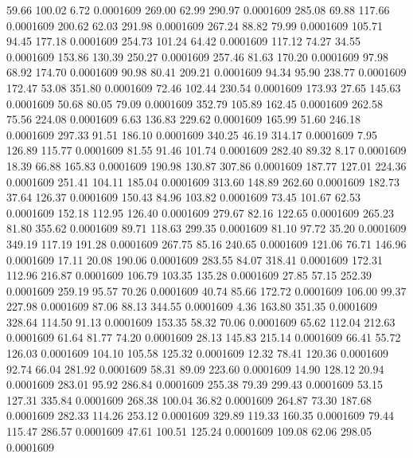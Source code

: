   59.66  100.02    6.72   0.0001609
 269.00   62.99  290.97   0.0001609
 285.08   69.88  117.66   0.0001609
 200.62   62.03  291.98   0.0001609
 267.24   88.82   79.99   0.0001609
 105.71   94.45  177.18   0.0001609
 254.73  101.24   64.42   0.0001609
 117.12   74.27   34.55   0.0001609
 153.86  130.39  250.27   0.0001609
 257.46   81.63  170.20   0.0001609
  97.98   68.92  174.70   0.0001609
  90.98   80.41  209.21   0.0001609
  94.34   95.90  238.77   0.0001609
 172.47   53.08  351.80   0.0001609
  72.46  102.44  230.54   0.0001609
 173.93   27.65  145.63   0.0001609
  50.68   80.05   79.09   0.0001609
 352.79  105.89  162.45   0.0001609
 262.58   75.56  224.08   0.0001609
   6.63  136.83  229.62   0.0001609
 165.99   51.60  246.18   0.0001609
 297.33   91.51  186.10   0.0001609
 340.25   46.19  314.17   0.0001609
   7.95  126.89  115.77   0.0001609
  81.55   91.46  101.74   0.0001609
 282.40   89.32    8.17   0.0001609
  18.39   66.88  165.83   0.0001609
 190.98  130.87  307.86   0.0001609
 187.77  127.01  224.36   0.0001609
 251.41  104.11  185.04   0.0001609
 313.60  148.89  262.60   0.0001609
 182.73   37.64  126.37   0.0001609
 150.43   84.96  103.82   0.0001609
  73.45  101.67   62.53   0.0001609
 152.18  112.95  126.40   0.0001609
 279.67   82.16  122.65   0.0001609
 265.23   81.80  355.62   0.0001609
  89.71  118.63  299.35   0.0001609
  81.10   97.72   35.20   0.0001609
 349.19  117.19  191.28   0.0001609
 267.75   85.16  240.65   0.0001609
 121.06   76.71  146.96   0.0001609
  17.11   20.08  190.06   0.0001609
 283.55   84.07  318.41   0.0001609
 172.31  112.96  216.87   0.0001609
 106.79  103.35  135.28   0.0001609
  27.85   57.15  252.39   0.0001609
 259.19   95.57   70.26   0.0001609
  40.74   85.66  172.72   0.0001609
 106.00   99.37  227.98   0.0001609
  87.06   88.13  344.55   0.0001609
   4.36  163.80  351.35   0.0001609
 328.64  114.50   91.13   0.0001609
 153.35   58.32   70.06   0.0001609
  65.62  112.04  212.63   0.0001609
  61.64   81.77   74.20   0.0001609
  28.13  145.83  215.14   0.0001609
  66.41   55.72  126.03   0.0001609
 104.10  105.58  125.32   0.0001609
  12.32   78.41  120.36   0.0001609
  92.74   66.04  281.92   0.0001609
  58.31   89.09  223.60   0.0001609
  14.90  128.12   20.94   0.0001609
 283.01   95.92  286.84   0.0001609
 255.38   79.39  299.43   0.0001609
  53.15  127.31  335.84   0.0001609
 268.38  100.04   36.82   0.0001609
 264.87   73.30  187.68   0.0001609
 282.33  114.26  253.12   0.0001609
 329.89  119.33  160.35   0.0001609
  79.44  115.47  286.57   0.0001609
  47.61  100.51  125.24   0.0001609
 109.08   62.06  298.05   0.0001609
